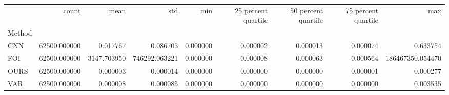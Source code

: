 \begin{tabular}{lrrrrrrrr}
 & count & mean & std & min & 25 percent quartile & 50 percent quartile & 75 percent quartile & max \\
Method &  &  &  &  &  &  &  &  \\
CNN & 62500.000000 & 0.017767 & 0.086703 & 0.000000 & 0.000002 & 0.000013 & 0.000074 & 0.633754 \\
FOI & 62500.000000 & 3147.703950 & 746292.063221 & 0.000000 & 0.000008 & 0.000063 & 0.000564 & 186467350.054470 \\
OURS & 62500.000000 & 0.000003 & 0.000014 & 0.000000 & 0.000000 & 0.000000 & 0.000001 & 0.000277 \\
VAR & 62500.000000 & 0.000008 & 0.000085 & 0.000000 & 0.000000 & 0.000000 & 0.000000 & 0.003535 \\
\end{tabular}
